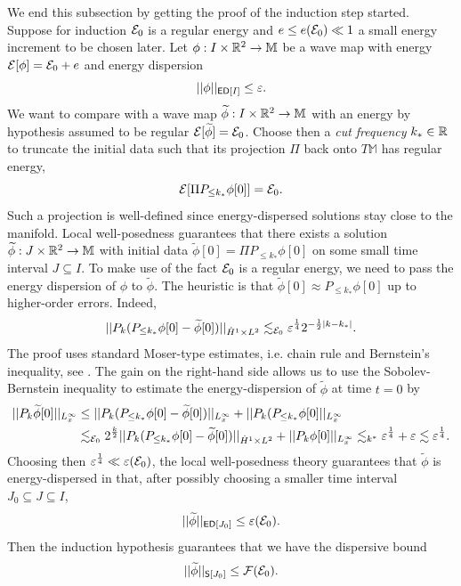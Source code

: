 We end this subsection by getting the proof of the induction step started. Suppose for induction $\mathcal E_0$ is a regular energy and $e \leq e(\mathcal E_0) \ll 1$ a small energy increment to be chosen later. Let $\phi : I \times \mathbb R^2 \to \mathbb M$ be a wave map with energy $\mathcal E[\phi] = \mathcal E_0 + e$ and energy dispersion 
	\[ ||\phi||_{\mathsf{ED}[I]} \leq \varepsilon.\]
We want to compare with a wave map $\widetilde \phi : I \times \mathbb R^2 \to \mathbb M$ with an energy by hypothesis assumed to be regular $\mathcal E[\widetilde \phi] = \mathcal E_0$. Choose then a \emph{cut frequency} $k_* \in \mathbb R$ to truncate the initial data  such that its projection $\Pi$ back onto $T\mathbb M$ has regular energy,
	\[ \mathcal E[\Pi P_{\leq k_*}  \phi[0]] = \mathcal E_0. \]
Such a projection is well-defined since energy-dispersed solutions stay close to the manifold. Local well-posedness guarantees that there exists a solution $\widetilde \phi : J \times \mathbb R^2 \to \mathbb M$ with initial data $\widetilde \phi[0] = \Pi P_{\leq k_*}  \phi[0]$ on some small time interval $J \subseteq I$. To make use of the fact $\mathcal E_0$ is a regular energy, we need to pass the energy dispersion of $\phi$ to $\widetilde \phi$. The heuristic is that $\widetilde \phi[0] \approx P_{\leq k_*} \phi[0]$ up to higher-order errors. Indeed, 
	\begin{equation}
		||P_k (P_{\leq k_*} \phi [0] - \widetilde \phi[0]) ||_{\dot H^1 \times L^2} \lesssim_{\mathcal E_0} \varepsilon^{\frac14} 2^{-\frac12 |k - k_*|}.
	\end{equation}
The proof uses standard Moser-type estimates, i.e. chain rule and Bernstein's inequality, see \cite[Section 11]{SterbenzTataru2010}. The gain on the right-hand side allows us to use the Sobolev-Bernstein inequality to estimate the energy-dispersion of $\widetilde \phi$ at time $t = 0$ by 
	\begin{align*}
		||P_k \widetilde \phi [0]||_{L^\infty_x}
			&\leq ||P_k (P_{\leq k_*} \phi [0] - \widetilde \phi[0]) ||_{L^\infty_x} + ||P_k (P_{\leq k_*} \phi [0]||_{L^\infty_x} \\
			&\lesssim_{\mathcal E_0} 2^{\frac{k}{2}} ||P_k (P_{\leq k_*} \phi [0] - \widetilde \phi[0]) ||_{\dot H^1 \times L^2}  + ||P_k \phi[0]||_{L^\infty_x}\lesssim_{k^*} \varepsilon^{\frac14} + \varepsilon \lesssim \varepsilon^{\frac14}. 
	\end{align*}
Choosing then $\varepsilon^{\frac14} \ll \varepsilon (\mathcal E_0)$, the local well-posedness theory guarantees that $\widetilde \phi$ is energy-dispersed in that, after possibly choosing a smaller time interval $J_0 \subseteq J \subseteq I$,  
	\[ ||\widetilde\phi||_{\mathsf{ED}[J_0]} \leq \varepsilon (\mathcal E_0).  \]
Then the induction hypothesis guarantees that we have the dispersive bound
	\[ ||\widetilde \phi ||_{\mathsf S [J_0]} \leq \mathcal F (\mathcal E_0).  \]


